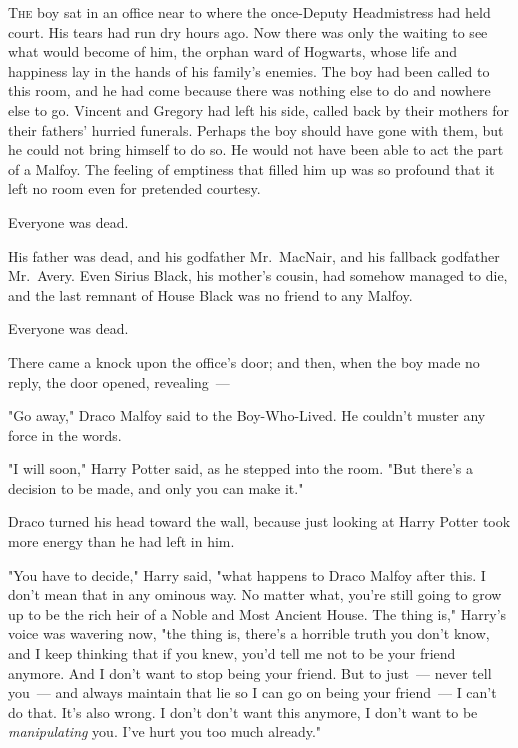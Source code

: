 
\lettrine{T}{he} boy sat in an office near to where the once-Deputy Headmistress had held
court. His tears had run dry hours ago. Now there was only the waiting to see
what would become of him, the orphan ward of Hogwarts, whose life and happiness
lay in the hands of his family's enemies. The boy had been called to this room,
and he had come because there was nothing else to do and nowhere else to go.
Vincent and Gregory had left his side, called back by their mothers for their
fathers' hurried funerals. Perhaps the boy should have gone with them, but he
could not bring himself to do so. He would not have been able to act the part
of a Malfoy. The feeling of emptiness that filled him up was so profound that
it left no room even for pretended courtesy.

Everyone was dead.

His father was dead, and his godfather Mr.~MacNair, and his fallback godfather
Mr.~Avery. Even Sirius Black, his mother's cousin, had somehow managed to die,
and the last remnant of House Black was no friend to any Malfoy.

Everyone was dead.

There came a knock upon the office's door; and then, when the boy made no
reply, the door opened, revealing~---

"Go away," Draco Malfoy said to the Boy-Who-Lived. He couldn't muster any force
in the words.

"I will soon," Harry Potter said, as he stepped into the room. "But there's a
decision to be made, and only you can make it."

Draco turned his head toward the wall, because just looking at Harry Potter
took more energy than he had left in him.

"You have to decide," Harry said, "what happens to Draco Malfoy after this. I
don't mean that in any ominous way. No matter what, you're still going to grow
up to be the rich heir of a Noble and Most Ancient House. The thing is,"
Harry's voice was wavering now, "the thing is, there's a horrible truth you
don't know, and I keep thinking that if you knew, you'd tell me not to be your
friend anymore. And I don't want to stop being your friend. But to just~--- never
tell you~--- and always maintain that lie so I can go on being your friend~--- I
can't do that. It's also wrong. I don't{\el} don't want this anymore, I
don't want to be \emph{manipulating} you. I've hurt you too much already."

